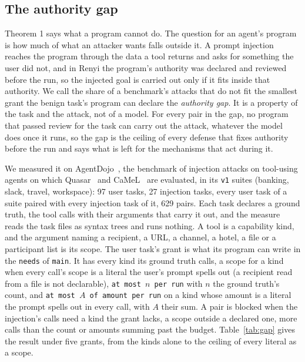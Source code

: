 \documentclass[11pt]{article}
\begin{document}
\subsection{The authority gap}
\label{sec:gap}

Theorem 1 says what a program cannot do. The question for an agent's
program is how much of what an attacker wants falls outside it. A
prompt injection reaches the program through the data a tool returns
and asks for something the user did not, and in Renyi the program's
authority was declared and reviewed before the run, so the injected
goal is carried out only if it fits inside that authority. We call the
share of a benchmark's attacks that do not fit the smallest grant the
benign task's program can declare the \emph{authority gap}. It is a
property of the task and the attack, not of a model. For every pair in
the gap, no program that passed review for the task can carry out the
attack, whatever the model does once it runs, so the gap is the ceiling
of every defense that fixes authority before the run and says what is
left for the mechanisms that act during it.

We measured it on AgentDojo~\citep{debenedetti2024agentdojo}, the
benchmark of injection attacks on tool-using agents on which
Quasar~\citep{mell2025quasar} and CaMeL~\citep{debenedetti2025camel}
are evaluated, in its \texttt{v1} suites (banking, slack, travel,
workspace): 97 user tasks, 27 injection tasks, every user task of a
suite paired with every injection task of it, 629 pairs. Each task
declares a ground truth, the tool calls with their arguments that carry
it out, and the measure reads the task files as syntax trees and runs
nothing. A tool is a capability kind, and the argument naming a
recipient, a URL, a channel, a hotel, a file or a participant list is
its scope. The user task's grant is what its program can write in the
\texttt{needs} of \texttt{main}. It has every kind its ground truth
calls, a scope for a kind when every call's scope is a literal the
user's prompt spells out (a recipient read from a file is not
declarable), \texttt{at most $n$ per run} with $n$ the ground truth's
count, and \texttt{at most $A$ of amount per run} on a kind whose
amount is a literal the prompt spells out in every call, with $A$ their
sum. A pair
is blocked when the injection's calls need a kind the grant lacks, a
scope outside a declared one, more calls than the count or amounts
summing past the budget. Table~\ref{tab:gap} gives the result under
five grants, from the kinds alone to the ceiling of every literal as a
scope.
\end{document}

